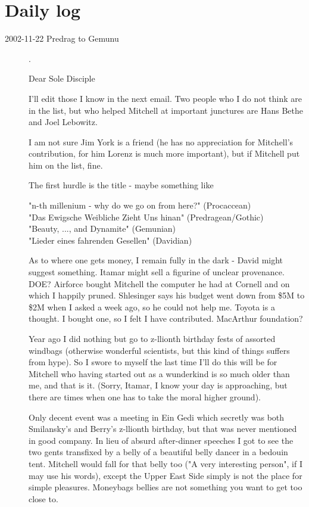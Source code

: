 

\chapter{Daily log}
\label{c-dailyBlog}

\begin{description}

\item[2002-11-22 Predrag to Gemunu].

Dear Sole Disciple

I'll edit those I know in the next email. Two people who I do not think
are in the list, but who helped Mitchell at important junctures are
Hans Bethe
and
Joel Lebowitz.

I am not sure Jim York is a friend (he has no appreciation for Mitchell's
contribution, for him Lorenz is much more important), but if Mitchell put
him on the list, fine.

The first hurdle is the title - maybe something like

\noindent
"n-th millenium - why do we go on from here?" (Procaccean)\\
"Das Ewigsche Weibliche Zieht Uns hinan" (Predragean/Gothic)\\
"Beauty, ..., and Dynamite" (Gemunian)\\
"Lieder eines fahrenden Gesellen" (Davidian)

As to where one gets money, I remain fully in the dark -
David might suggest something. Itamar might sell a figurine of unclear
provenance. DOE? Airforce bought Mitchell the computer he had at Cornell
and on which I happily pruned. Shlesinger says his budget went down from
\$5M to \$2M when I asked a week ago, so he could not help me. Toyota is a
thought. I bought one, so I felt I have contributed. MacArthur foundation?

Year ago I did nothing but go to z-llionth birthday fests of assorted
windbags (otherwise wonderful scientists, but this kind of things suffers
from hype). So I swore to myself the last time I'll do this will be for
Mitchell who having started out as a wunderkind is so much older than me,
and that is it. (Sorry, Itamar, I know your day is approaching, but there
are times when one has to take the moral higher ground).

Only decent event was a meeting in Ein Gedi which secretly was both
Smilansky's and Berry's z-llionth birthday, but that was never mentioned in
good company. In lieu of absurd after-dinner speeches I got to see the two
gents transfixed by a belly of a beautiful belly dancer in a bedouin tent.
Mitchell would fall for that belly too ("A very interesting person", if I
may use his words), except the Upper East Side simply is not the place for
simple pleasures. Moneybags bellies are not something you want to get too
close to.


\end{description}
